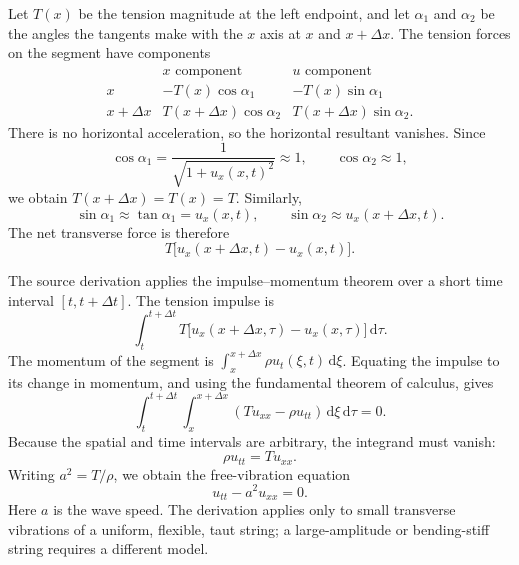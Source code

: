 Let $T(x)$ be the tension magnitude at the left endpoint, and let $\alpha_1$ and $\alpha_2$ be the angles the tangents make with the $x$ axis at $x$ and $x+\Delta x$. The tension forces on the segment have components
\begin{equation}
\begin{array}{c|cc}
&x\text{ component}&u\text{ component}\\ \hline
x&-T(x)\cos\alpha_1&-T(x)\sin\alpha_1\\
x+\Delta x&T(x+\Delta x)\cos\alpha_2&T(x+\Delta x)\sin\alpha_2.
\end{array}
\end{equation}
There is no horizontal acceleration, so the horizontal resultant vanishes. Since
\begin{equation}
\cos\alpha_1=\frac{1}{\sqrt{1+u_x(x,t)^2}}\approx1,
\qquad
\cos\alpha_2\approx1,
\end{equation}
we obtain $T(x+\Delta x)=T(x)=T$. Similarly,
\begin{equation}
\sin\alpha_1\approx\tan\alpha_1=u_x(x,t),
\qquad
\sin\alpha_2\approx u_x(x+\Delta x,t).
\end{equation}
The net transverse force is therefore
\begin{equation}
T\bigl[u_x(x+\Delta x,t)-u_x(x,t)\bigr].
\end{equation}

The source derivation applies the impulse--momentum theorem over a short time interval $[t,t+\Delta t]$. The tension impulse is
\begin{equation}
\int_t^{t+\Delta t}T\bigl[u_x(x+\Delta x,\tau)-u_x(x,\tau)\bigr] \,\mathrm{d}\tau.
\end{equation}
The momentum of the segment is $\int_x^{x+\Delta x}\rho u_t(\xi,t)\,\mathrm{d}\xi$. Equating the impulse to its change in momentum, and using the fundamental theorem of calculus, gives
\begin{equation}
\int_t^{t+\Delta t}\int_x^{x+\Delta x}
\left(Tu_{xx}-\rho u_{tt}\right)\,\mathrm{d}\xi\,\mathrm{d}\tau=0.
\end{equation}
Because the spatial and time intervals are arbitrary, the integrand must vanish:
\begin{equation}
\rho u_{tt}=T u_{xx}.
\end{equation}
Writing $a^2=T/\rho$, we obtain the free-vibration equation
\begin{equation}
u_{tt}-a^2u_{xx}=0.
\label{eq:ch04-wave}
\end{equation}
Here $a$ is the wave speed. The derivation applies only to small transverse vibrations of a uniform, flexible, taut string; a large-amplitude or bending-stiff string requires a different model.

